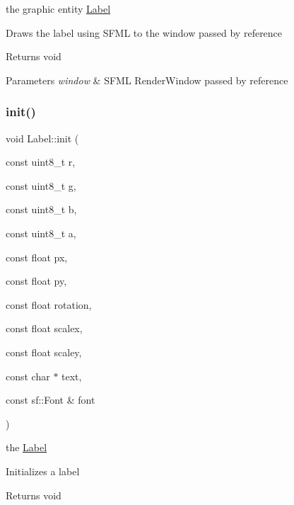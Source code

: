 the graphic entity \hyperlink{class_label}{Label}

Draws the label using S\+F\+ML to the window passed by reference

\begin{DoxyReturn}{Returns}
void 
\end{DoxyReturn}

\begin{DoxyParams}{Parameters}
{\em window} & S\+F\+ML Render\+Window passed by reference \\
\hline
\end{DoxyParams}
\mbox{\label{class_label_ab69dd0268124ac21d55b87734fd282a0}} 
\subsubsection{\texorpdfstring{init()}{init()}}
{\footnotesize\ttfamily void Label\+::init (\begin{DoxyParamCaption}\item[{const uint8\+\_\+t}]{r,  }\item[{const uint8\+\_\+t}]{g,  }\item[{const uint8\+\_\+t}]{b,  }\item[{const uint8\+\_\+t}]{a,  }\item[{const float}]{px,  }\item[{const float}]{py,  }\item[{const float}]{rotation,  }\item[{const float}]{scalex,  }\item[{const float}]{scaley,  }\item[{const char $\ast$}]{text,  }\item[{const sf\+::\+Font \&}]{font }\end{DoxyParamCaption})}

the \hyperlink{class_label}{Label}

Initializes a label

\begin{DoxyReturn}{Returns}
void 
\end{DoxyReturn}

